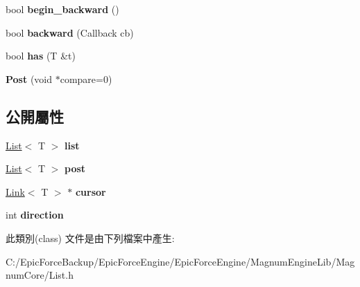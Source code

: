 \begin{DoxyCompactItemize}
\item 
bool {\bfseries begin\+\_\+backward} ()\hypertarget{class_magnum_1_1_post_a489367be82164d12e6b2bf545acc8395}{}\label{class_magnum_1_1_post_a489367be82164d12e6b2bf545acc8395}

\item 
bool {\bfseries backward} (Callback cb)\hypertarget{class_magnum_1_1_post_a419532a1a974c365d523e7e3934a04f3}{}\label{class_magnum_1_1_post_a419532a1a974c365d523e7e3934a04f3}

\item 
bool {\bfseries has} (T \&t)\hypertarget{class_magnum_1_1_post_a0689b978b7b391837c5f1b585f240d65}{}\label{class_magnum_1_1_post_a0689b978b7b391837c5f1b585f240d65}

\item 
{\bfseries Post} (void $\ast$compare=0)\hypertarget{class_magnum_1_1_post_a8326c068b5a3f02ff2f8408e05de3033}{}\label{class_magnum_1_1_post_a8326c068b5a3f02ff2f8408e05de3033}

\end{DoxyCompactItemize}
\subsection*{公開屬性}
\begin{DoxyCompactItemize}
\item 
\hyperlink{class_magnum_1_1_list}{List}$<$ T $>$ {\bfseries list}\hypertarget{class_magnum_1_1_post_a9092cdda83edb20b9420120ae5d19121}{}\label{class_magnum_1_1_post_a9092cdda83edb20b9420120ae5d19121}

\item 
\hyperlink{class_magnum_1_1_list}{List}$<$ T $>$ {\bfseries post}\hypertarget{class_magnum_1_1_post_ab65d49a474cfc02f1c9cda1e56d49e66}{}\label{class_magnum_1_1_post_ab65d49a474cfc02f1c9cda1e56d49e66}

\item 
\hyperlink{class_magnum_1_1_link}{Link}$<$ T $>$ $\ast$ {\bfseries cursor}\hypertarget{class_magnum_1_1_post_af85fd1a41cc732268c4cd3a9a497a45f}{}\label{class_magnum_1_1_post_af85fd1a41cc732268c4cd3a9a497a45f}

\item 
int {\bfseries direction}\hypertarget{class_magnum_1_1_post_a03e0f4a5656d6322e6f86508294bb7d7}{}\label{class_magnum_1_1_post_a03e0f4a5656d6322e6f86508294bb7d7}

\end{DoxyCompactItemize}


此類別(class) 文件是由下列檔案中產生\+:\begin{DoxyCompactItemize}
\item 
C\+:/\+Epic\+Force\+Backup/\+Epic\+Force\+Engine/\+Epic\+Force\+Engine/\+Magnum\+Engine\+Lib/\+Magnum\+Core/List.\+h\end{DoxyCompactItemize}
